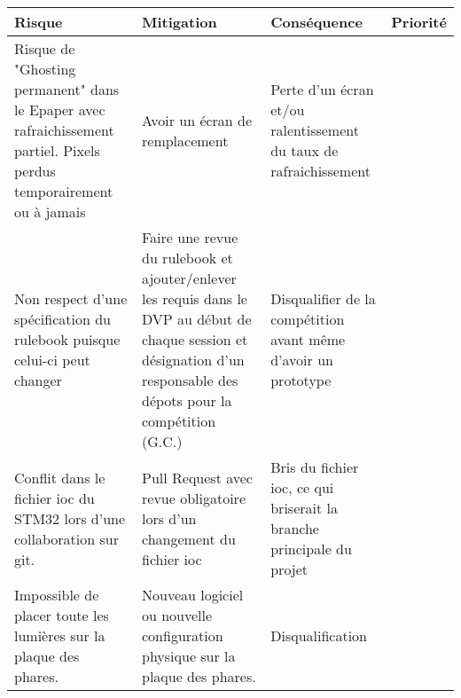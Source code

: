 \begin{tabularx}{\linewidth}{
    |>{\hsize=0.40\hsize}X|%
    >{\hsize=0.25\hsize}X|%
    >{\hsize=0.25\hsize}X|%
    >{\hsize=0.1\hsize}X|%
  }
    \hline
    \textbf{Risque} & \textbf{Mitigation} & \textbf{Conséquence} & \textbf{Priorité}\\\hline
    Risque de "Ghosting permanent" dans le Epaper avec rafraichissement partiel. Pixels perdus temporairement ou à jamais & Avoir un écran de remplacement & Perte d'un écran et/ou ralentissement du taux de rafraichissement & 1 \\\hline %
    Non respect d'une spécification du rulebook puisque celui-ci peut changer & Faire une revue du rulebook et ajouter/enlever les requis dans le DVP au début de chaque session et désignation d'un responsable des dépots pour la compétition (G.C.) & Disqualifier de la compétition avant même d'avoir un prototype & 1\\\hline
    Conflit dans le fichier ioc du STM32 lors d'une collaboration sur git. & Pull Request avec revue obligatoire lors d'un changement du fichier ioc& Bris du fichier ioc, ce qui briserait la branche principale du projet & 1 \\\hline 
    Impossible de placer toute les lumières sur la plaque des phares. & Nouveau logiciel ou nouvelle configuration physique sur la plaque des phares. & Disqualification & 1 \\\hline
  \end{tabularx}
  
  

  
